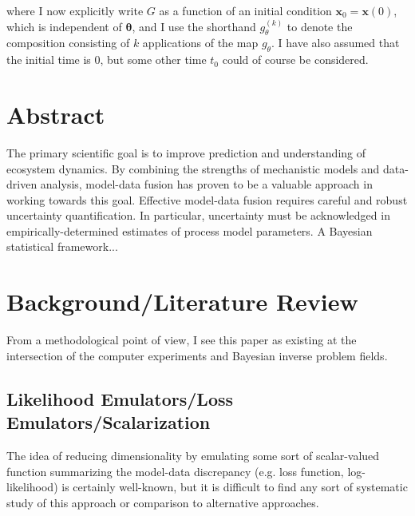 \documentclass[12pt]{article}
\newcommand{\btheta}{\boldsymbol{\theta}}
\newcommand{\bx}{\mathbf{x}}
\begin{document}
 where I now explicitly write $G$ as a function of an initial condition $\bx_0 = \bx(0)$, which is independent of $\btheta$, and I use the shorthand $g_\theta^{(k)}$ to denote 
 the composition consisting of $k$ applications of the map $g_\theta$. I have also assumed that the initial time is $0$, but 
 some other time $t_0$ could of course be considered. 

\section{Abstract}
The primary scientific goal is to improve prediction and understanding of ecosystem dynamics. By combining the strengths of mechanistic models and data-driven analysis, model-data fusion 
has proven to be a valuable approach in working towards this goal. Effective model-data fusion requires careful and robust uncertainty quantification. In particular, uncertainty must be acknowledged 
in empirically-determined estimates of process model parameters. A Bayesian statistical framework...

\section{Background/Literature Review}
From a methodological point of view, I see this paper as existing at the intersection of the computer experiments and Bayesian inverse problem fields. 
 
 \subsection{Likelihood Emulators/Loss Emulators/Scalarization}
 The idea of reducing dimensionality by emulating some sort of scalar-valued function summarizing the model-data discrepancy (e.g. loss function, log-likelihood) is certainly well-known, but 
 it is difficult to find any sort of systematic study of this approach or comparison to alternative approaches. 
 
\end{document}

